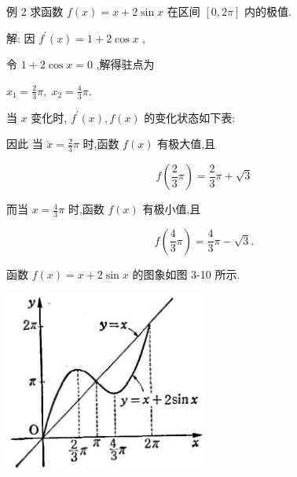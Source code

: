 \documentclass[lang=cn,newtx,10pt,scheme=chinese]{elegantbook}
\begin{document}
例 2 求函数 \(f\left( x\right) = x + 2\sin x\) 在区间 \(\left\lbrack {0,{2\pi }}\right\rbrack\) 内的极值.

解: 因 \({f}^{\prime }\left( x\right) = 1 + 2\cos x\) ,

令 \(1 + 2\cos x = 0\) ,解得驻点为

\({x}_{1} = \frac{2}{3}\pi ,\;{x}_{2} = \frac{4}{3}\pi .\)

当 \(x\) 变化时, \({f}^{\prime }\left( x\right) ,f\left( x\right)\) 的变化状态如下表:

\begin{center}
\end{center}

因此 当 \(\dot{x} = \frac{2}{3}\pi\) 时,函数 \(f\left( x\right)\) 有极大值,且

\[
f\left( {\frac{2}{3}\pi }\right) = \frac{2}{3}\pi + \sqrt{3}
\]

而当 \(x = \frac{4}{3}\pi\) 时,函数 \(f\left( x\right)\) 有极小值,且

\[
f\left( {\frac{4}{3}\pi }\right) = \frac{4}{3}\pi - \sqrt{3}.
\]

函数 \(f\left( x\right) = x + 2\sin x\) 的图象如图 3-10 所示.

\begin{center}
\includegraphics[max width=0.5\textwidth]{images/01912c18-5c3f-733d-b775-749ba9897a9d_144_191268.jpg}
\end{center}
\end{document}
